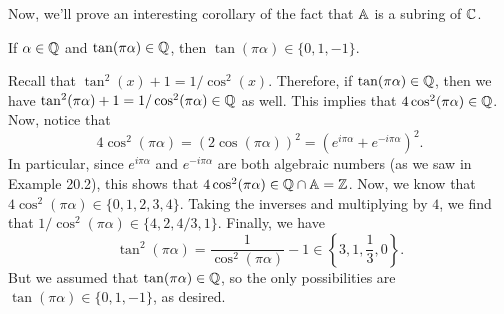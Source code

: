 Now, we'll prove an interesting corollary of the fact that $\mathbb{A}$ is a subring of $\mathbb{C}$.

\begin{cor}{}
    If $\alpha \in \mathbb{Q}$ and $\tan(\pi\alpha) \in \mathbb{Q}$, then $\tan(\pi\alpha) 
    \in \{0, 1, -1\}$. 
\end{cor}
\begin{pf}
    Recall that $\tan^2(x) + 1 = 1/\cos^2(x)$. Therefore, if $\tan(\pi\alpha) 
    \in \mathbb{Q}$, then we have $\tan^2(\pi\alpha) + 1 = 1/\cos^2(\pi\alpha) \in \mathbb{Q}$ as 
    well. This implies that $4\cos^2(\pi\alpha) \in \mathbb{Q}$. Now, notice that 
    \[ 4\cos^2(\pi\alpha) = (2 \cos(\pi\alpha))^2 = (e^{i\pi\alpha} + 
    e^{-i\pi\alpha})^2. \] 
    In particular, since $e^{i\pi\alpha}$ and $e^{-i\pi\alpha}$ are both 
    algebraic numbers (as we saw in Example 20.2), this shows that 
    $4\cos^2(\pi\alpha) \in \mathbb{Q} \cap \mathbb{A} = \mathbb{Z}$. Now, we know that 
    $4\cos^2(\pi\alpha) \in \{0, 1, 2, 3, 4\}$. Taking the inverses and 
    multiplying by $4$, we find that $1/\cos^2(\pi\alpha) \in \{4, 2, 4/3, 1\}$. 
    Finally, we have 
    \[ \tan^2(\pi\alpha) = \frac{1}{\cos^2(\pi\alpha)} - 1 \in 
    \left\{3, 1, \frac13, 0\right\}. \]  
    But we assumed that $\tan(\pi\alpha) \in \mathbb{Q}$, so the only possibilities are 
    $\tan(\pi\alpha) \in \{0, 1, -1\}$, as desired. 
\end{pf}